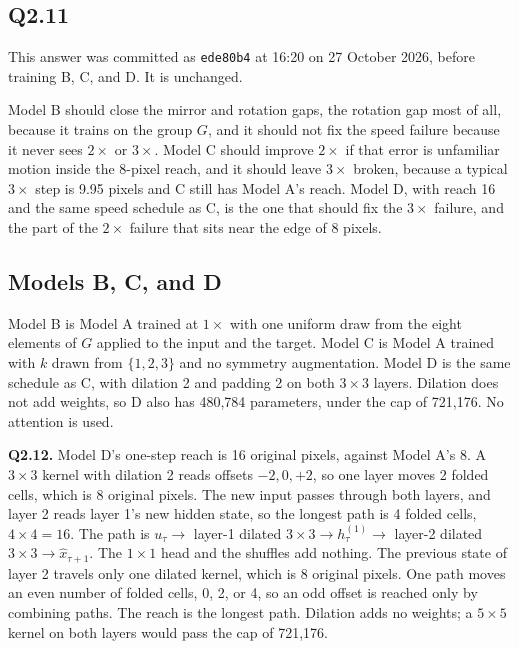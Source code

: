 \documentclass[11pt,a4paper]{article}
\begin{document}
\subsection{Q2.11}

This answer was committed as \texttt{ede80b4} at 16:20 on 27 October 2026, before training B, C, and D. It is unchanged.

Model B should close the mirror and rotation gaps, the rotation gap most of all, because it trains on the group \(G\), and it should not fix the speed failure because it never sees \(2\times\) or \(3\times\). Model C should improve \(2\times\) if that error is unfamiliar motion inside the 8-pixel reach, and it should leave \(3\times\) broken, because a typical \(3\times\) step is 9.95 pixels and C still has Model A's reach. Model D, with reach 16 and the same speed schedule as C, is the one that should fix the \(3\times\) failure, and the part of the \(2\times\) failure that sits near the edge of 8 pixels.

\subsection{Models B, C, and D}

Model B is Model A trained at \(1\times\) with one uniform draw from the eight elements of \(G\) applied to the input and the target. Model C is Model A trained with \(k\) drawn from \(\{1,2,3\}\) and no symmetry augmentation. Model D is the same schedule as C, with dilation 2 and padding 2 on both \(3\times 3\) layers. Dilation does not add weights, so D also has 480{,}784 parameters, under the cap of 721{,}176. No attention is used.

\textbf{Q2.12.} Model D's one-step reach is 16 original pixels, against Model A's 8. A \(3\times 3\) kernel with dilation 2 reads offsets \(-2,0,+2\), so one layer moves 2 folded cells, which is 8 original pixels. The new input passes through both layers, and layer 2 reads layer 1's new hidden state, so the longest path is 4 folded cells, \(4\times 4 = 16\). The path is \(u_{\tau}\rightarrow\) layer-1 dilated \(3\times 3\rightarrow h^{(1)}_{\tau}\rightarrow\) layer-2 dilated \(3\times 3\rightarrow\hat x_{\tau+1}\). The \(1\times 1\) head and the shuffles add nothing. The previous state of layer 2 travels only one dilated kernel, which is 8 original pixels. One path moves an even number of folded cells, 0, 2, or 4, so an odd offset is reached only by combining paths. The reach is the longest path. Dilation adds no weights; a \(5\times 5\) kernel on both layers would pass the cap of 721{,}176.
\end{document}
